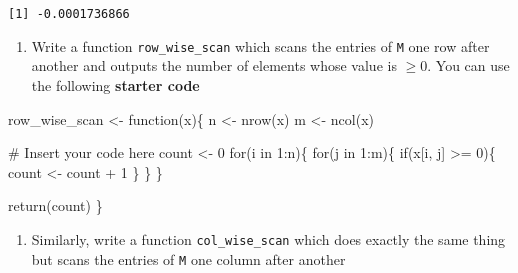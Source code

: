 \documentclass[
  letterpaper,
  DIV=11,
  numbers=noendperiod]{scrartcl}
\newenvironment{Shaded}{\begin{snugshade}}{\end{snugshade}}
\newcommand{\CommentTok}[1]{\textcolor[rgb]{0.37,0.37,0.37}{#1}}
\newcommand{\ControlFlowTok}[1]{\textcolor[rgb]{0.00,0.23,0.31}{#1}}
\newcommand{\DecValTok}[1]{\textcolor[rgb]{0.68,0.00,0.00}{#1}}
\newcommand{\FunctionTok}[1]{\textcolor[rgb]{0.28,0.35,0.67}{#1}}
\newcommand{\NormalTok}[1]{\textcolor[rgb]{0.00,0.23,0.31}{#1}}
\newcommand{\OtherTok}[1]{\textcolor[rgb]{0.00,0.23,0.31}{#1}}
\newcommand{\SpecialCharTok}[1]{\textcolor[rgb]{0.37,0.37,0.37}{#1}}
\providecommand{\tightlist}{%
  \setlength{\itemsep}{0pt}\setlength{\parskip}{0pt}}\usepackage{longtable,booktabs,array}
\begin{document}
\begin{verbatim}
[1] -0.0001736866
\end{verbatim}

\begin{enumerate}
\def\labelenumi{\arabic{enumi}.}
\setcounter{enumi}{1}
\tightlist
\item
  Write a function \texttt{row\_wise\_scan} which scans the entries of
  \texttt{M} one row after another and outputs the number of elements
  whose value is \(\ge 0\). You can use the following \textbf{starter
  code}
\end{enumerate}

\begin{Shaded}
\begin{Highlighting}[]
\NormalTok{row\_wise\_scan }\OtherTok{\textless{}{-}} \ControlFlowTok{function}\NormalTok{(x)\{}
\NormalTok{    n }\OtherTok{\textless{}{-}} \FunctionTok{nrow}\NormalTok{(x)}
\NormalTok{    m }\OtherTok{\textless{}{-}} \FunctionTok{ncol}\NormalTok{(x)}

    \CommentTok{\# Insert your code here}
\NormalTok{    count }\OtherTok{\textless{}{-}} \DecValTok{0}
    \ControlFlowTok{for}\NormalTok{(i }\ControlFlowTok{in} \DecValTok{1}\SpecialCharTok{:}\NormalTok{n)\{}
        \ControlFlowTok{for}\NormalTok{(j }\ControlFlowTok{in} \DecValTok{1}\SpecialCharTok{:}\NormalTok{m)\{}
            \ControlFlowTok{if}\NormalTok{(x[i, j] }\SpecialCharTok{\textgreater{}=} \DecValTok{0}\NormalTok{)\{}
\NormalTok{                count }\OtherTok{\textless{}{-}}\NormalTok{ count }\SpecialCharTok{+} \DecValTok{1} 
\NormalTok{            \}}
\NormalTok{        \}}
\NormalTok{    \}}

    \FunctionTok{return}\NormalTok{(count)}
\NormalTok{\}}
\end{Highlighting}
\end{Shaded}

\begin{enumerate}
\def\labelenumi{\arabic{enumi}.}
\setcounter{enumi}{2}
\tightlist
\item
  Similarly, write a function \texttt{col\_wise\_scan} which does
  exactly the same thing but scans the entries of \texttt{M} one column
  after another
\end{enumerate}
\end{document}
